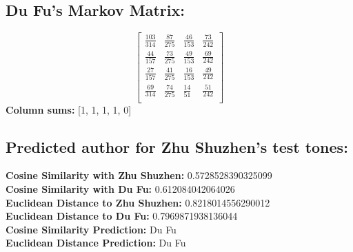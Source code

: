 \documentclass[12pt]{article}
\begin{document}
\subsection*{Du Fu's Markov Matrix:}
\[
\begin{bmatrix}
    \frac{103}{314} & \frac{87}{275} & \frac{46}{153} & \frac{73}{242} \\
    \frac{44}{157} & \frac{73}{275} & \frac{49}{153} & \frac{69}{242} \\
    \frac{27}{157} & \frac{41}{275} & \frac{16}{153} & \frac{49}{242}  \\
    \frac{69}{314} & \frac{74}{275} & \frac{14}{51} & \frac{51}{242}  \\
\end{bmatrix}
\]
\textbf{Column sums:} [1, 1, 1, 1, 0]

\subsection*{Predicted author for Zhu Shuzhen's test tones:}
\textbf{Cosine Similarity with Zhu Shuzhen:} 0.5728528390325099
\\
\textbf{Cosine Similarity with Du Fu:} 0.612084042064026
\\
\textbf{Euclidean Distance to Zhu Shuzhen:} 0.8218014556290012
\\
\textbf{Euclidean Distance to Du Fu:} 0.7969871938136044
\\
\textbf{Cosine Similarity Prediction:} Du Fu
\\
\textbf{Euclidean Distance Prediction:} Du Fu
\end{document}
